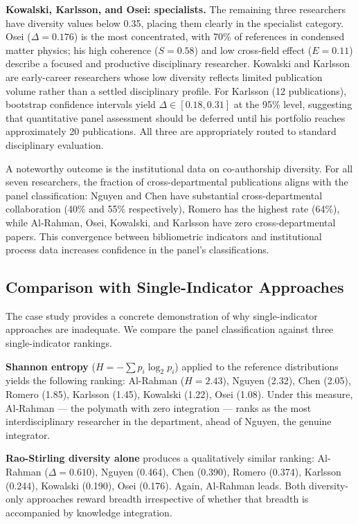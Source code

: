 \documentclass[
]{article}
\begin{document}
\textbf{Kowalski, Karlsson, and Osei: specialists.} The remaining three
researchers have diversity values below 0.35, placing them clearly in
the specialist category. Osei (\(\Delta = 0.176\)) is the most
concentrated, with 70\% of references in condensed matter physics; his
high coherence (\(S = 0.58\)) and low cross-field effect (\(E = 0.11\))
describe a focused and productive disciplinary researcher. Kowalski and
Karlsson are early-career researchers whose low diversity reflects
limited publication volume rather than a settled disciplinary profile.
For Karlsson (12 publications), bootstrap confidence intervals yield
\(\Delta \in [0.18, 0.31]\) at the 95\% level, suggesting that
quantitative panel assessment should be deferred until his portfolio
reaches approximately 20 publications. All three are appropriately
routed to standard disciplinary evaluation.

A noteworthy outcome is the institutional data on co-authorship
diversity. For all seven researchers, the fraction of cross-departmental
publications aligns with the panel classification: Nguyen and Chen have
substantial cross-departmental collaboration (40\% and 55\%
respectively), Romero has the highest rate (64\%), while Al-Rahman,
Osei, Kowalski, and Karlsson have zero cross-departmental papers. This
convergence between bibliometric indicators and institutional process
data increases confidence in the panel's classifications.

\hypertarget{comparison-with-single-indicator-approaches}{%
\subsection{Comparison with Single-Indicator
Approaches}\label{comparison-with-single-indicator-approaches}}

The case study provides a concrete demonstration of why single-indicator
approaches are inadequate. We compare the panel classification against
three single-indicator rankings.

\textbf{Shannon entropy} (\(H = -\sum p_i \log_2 p_i\)) applied to the
reference distributions yields the following ranking: Al-Rahman
(\(H = 2.43\)), Nguyen (2.32), Chen (2.05), Romero (1.85), Karlsson
(1.45), Kowalski (1.22), Osei (1.08). Under this measure, Al-Rahman ---
the polymath with zero integration --- ranks as the most
interdisciplinary researcher in the department, ahead of Nguyen, the
genuine integrator.

\textbf{Rao-Stirling diversity alone} produces a qualitatively similar
ranking: Al-Rahman (\(\Delta = 0.610\)), Nguyen (0.464), Chen (0.390),
Romero (0.374), Karlsson (0.244), Kowalski (0.190), Osei (0.176). Again,
Al-Rahman leads. Both diversity-only approaches reward breadth
irrespective of whether that breadth is accompanied by knowledge
integration.
\end{document}
